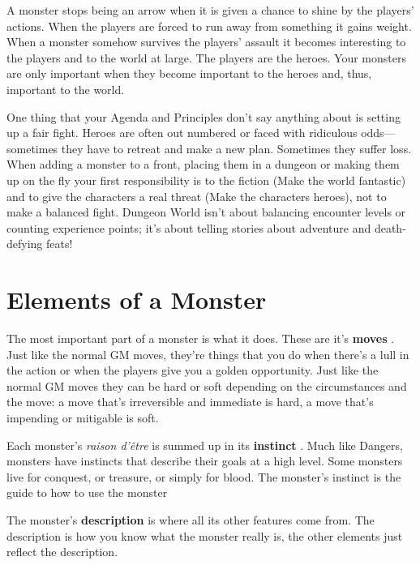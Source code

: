        

A monster stops being an arrow when it is given a chance to shine by the players' actions. When the players are forced to run away from something it gains weight. When a monster somehow survives the players' assault it becomes interesting to the players and to the world at large. The players are the heroes. Your monsters are only important when they become important to the heroes and, thus, important to the world.

       

One thing that your Agenda and Principles don't say anything about is setting up a fair fight. Heroes are often out numbered or faced with ridiculous odds—sometimes they have to retreat and make a new plan. Sometimes they suffer loss. When adding a monster to a front, placing them in a dungeon or making them up on the fly your first responsibility is to the fiction (Make the world fantastic) and to give the characters a real threat (Make the characters heroes), not to make a balanced fight. Dungeon World isn't about balancing encounter levels or counting experience points; it's about telling stories about adventure and death-defying feats!

       
\section{Elements of a Monster}    
       

The most important part of a monster is what it does. These are it's {\bf moves} . Just like the normal GM moves, they're things that you do when there's a lull in the action or when the players give you a golden opportunity. Just like the normal GM moves they can be hard or soft depending on the circumstances and the move: a move that's irreversible and immediate is hard, a move that's impending or mitigable is soft.

       

Each monster's {\em raison d'être}  is summed up in its {\bf instinct} . Much like Dangers, monsters have instincts that describe their goals at a high level. Some monsters live for conquest, or treasure, or simply for blood. The monster's instinct is the guide to how to use the monster

       

The monster's {\bf description}  is where all its other features come from. The description is how you know what the monster really is, the other elements just reflect the description.

